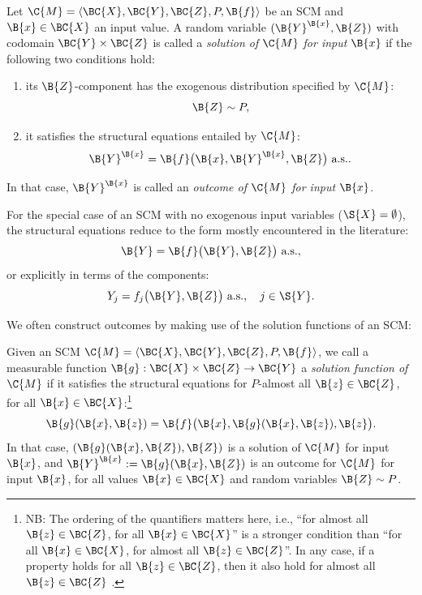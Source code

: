 \begin{Def}\label{def:scm_outcomes}
  Let $\C{M} = \langle \BC{X}, \BC{Y}, \BC{Z}, P, \B{f} \rangle$ be an SCM
  and $\B{x} \in \BC{X}$ an input value.
  A random variable $(\B{Y}^{\B{x}},\B{Z})$ with codomain $\BC{Y}\times\BC{Z}$ is called a
  \emph{solution of $\C{M}$ for input $\B{x}$} if the following two conditions hold:
    \begin{enumerate}
      \item its $\B{Z}$-component has the exogenous distribution specified by $\C{M}$: 
        $$\B{Z} \sim P,$$
      \item it satisfies the structural equations entailed by $\C{M}$:
        \begin{equation}\label{eq:cscm_structural_equations}
          \B{Y}^{\B{x}} = \B{f}\big(\B{x}, \B{Y}^{\B{x}}, \B{Z}\big) \text{ a.s.}.
        \end{equation}
    \end{enumerate}
  In that case, $\B{Y}^{\B{x}}$ is called an \emph{outcome of $\C{M}$ for input $\B{x}$}.
  
  For the special case of an SCM with no exogenous input variables ($\S{X} = \emptyset$), the
  structural equations reduce to the form mostly encountered in the literature:
  \begin{equation}\label{eq:scm_structural_equations}
    \B{Y} = \B{f}\big(\B{Y}, \B{Z}\big) \text{ a.s.},
  \end{equation}
  or explicitly in terms of the components:
  \begin{equation}\label{eq:scm_structural_equations_componentwise}
    Y_j = f_j\big(\B{Y}, \B{Z}\big) \text{ a.s.}, \quad j \in \S{Y}.
  \end{equation}
\end{Def}
We often construct outcomes by making use of the solution functions of an SCM:
\begin{Def}\label{def:scm_solution_functions}
  Given an SCM $\C{M} = \langle \BC{X}, \BC{Y}, \BC{Z}, P, \B{f} \rangle$, we call a measurable function
  $\B{g} : \BC{X} \times \BC{Z} \to \BC{Y}$ a \emph{solution function of $\C{M}$} if it satisfies the structural equations
  for $P$-almost all $\B{z}\in\BC{Z}$, for all $\B{x}\in\BC{X}$:\footnote{NB: The ordering of the quantifiers matters here, i.e., ``for almost all $\B{z}\in\BC{Z}$, for all $\B{x}\in\BC{X}$'' is a stronger condition than ``for all $\B{x}\in\BC{X}$, for almost all $\B{z}\in\BC{Z}$''. In any case, if a property holds for all $\B{z}\in\BC{Z}$, then it also hold for almost all $\B{z}\in\BC{Z}$ .} 
  $$\B{g}(\B{x},\B{z}) = \B{f}\big(\B{x}, \B{g}(\B{x},\B{z}), \B{z}\big).$$
  In that case, $(\B{g}(\B{x}, \B{Z}),\B{Z})$ is a solution of $\C{M}$ for input $\B{x}$, and 
  $\B{Y}^{\B{x}} := \B{g}(\B{x}, \B{Z})$ is an outcome for $\C{M}$ for input $\B{x}$,
  for all values $\B{x}\in\BC{X}$ and random variables $\B{Z} \sim P$.
\end{Def}


